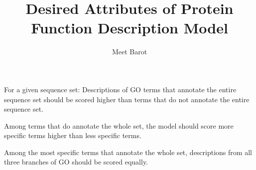 \documentclass{specification}
\title{Desired Attributes of Protein Function Description Model}
\author{Meet Barot}
\begin{document}
\maketitle

\attribute*
For a given sequence set:
Descriptions of GO terms that annotate the entire sequence set should be scored higher than terms that do not annotate the entire sequence set.

\attribute*
Among terms that do annotate the whole set, the model should score more specific terms higher than less specific terms.

\attribute*

Among the most specific terms that annotate the whole set, descriptions from all three branches of GO should be scored equally.
\end{document}
